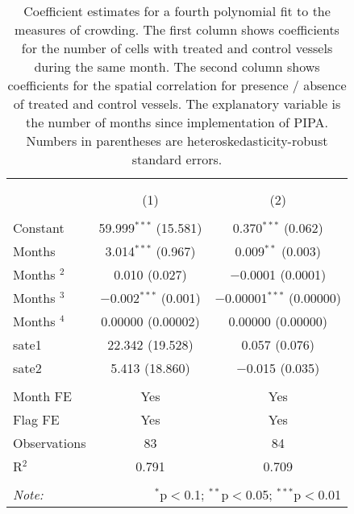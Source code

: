 
\begin{table}[!htbp] \centering 
  \caption{\label{tab:sp_corr}Coefficient estimates for a fourth polynomial fit to the measures of crowding. The first column shows coefficients for the number of cells with treated and control vessels during the same month. The second column shows coefficients for the spatial correlation for presence / absence of treated and control vessels. The explanatory variable is the number of months since implementation of PIPA. Numbers in parentheses are heteroskedasticity-robust standard errors.} 
  \label{} 
\footnotesize 
\begin{tabular}{@{\extracolsep{1pt}}lcc} 
\\[-1.8ex]\hline 
\hline \\[-1.8ex] 
\\[-1.8ex] & (1) & (2)\\ 
\hline \\[-1.8ex] 
 Constant & 59.999$^{***}$ (15.581) & 0.370$^{***}$ (0.062) \\ 
  Months & 3.014$^{***}$ (0.967) & 0.009$^{**}$ (0.003) \\ 
  Months $^2$ & 0.010 (0.027) & $-$0.0001 (0.0001) \\ 
  Months $^3$ & $-$0.002$^{***}$ (0.001) & $-$0.00001$^{***}$ (0.00000) \\ 
  Months $^4$ & 0.00000 (0.00002) & 0.00000 (0.00000) \\ 
  sate1 & 22.342 (19.528) & 0.057 (0.076) \\ 
  sate2 & 5.413 (18.860) & $-$0.015 (0.035) \\ 
 \hline \\[-1.8ex] 
Month FE & Yes & Yes \\ 
Flag FE & Yes & Yes \\ 
Observations & 83 & 84 \\ 
R$^{2}$ & 0.791 & 0.709 \\ 
\hline 
\hline \\[-1.8ex] 
\textit{Note:}  & \multicolumn{2}{r}{$^{*}$p$<$0.1; $^{**}$p$<$0.05; $^{***}$p$<$0.01} \\ 
\end{tabular} 
\end{table} 
